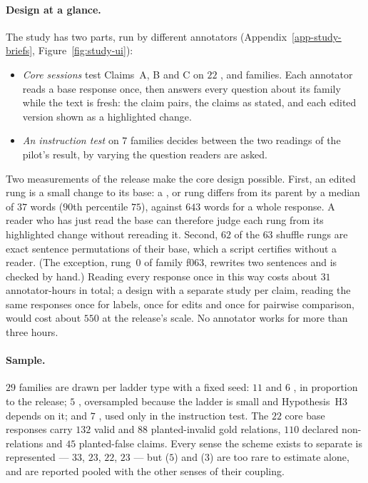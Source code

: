 \paragraph{Design at a glance.} The study has two parts, run by different annotators
(Appendix~\ref{app-study-briefs}, Figure~\ref{fig:study-ui}):
\begin{itemize}[leftmargin=1.4em,itemsep=1pt,topsep=2pt]
\item \emph{Core sessions} test Claims~A, B and C on $22$ ,  and 
  families. Each annotator reads a base response once, then answers every question about its family while the text
  is fresh: the claim pairs, the claims as stated, and each edited version shown as a highlighted change.
\item \emph{An instruction test} on $7$  families decides between the two readings of the pilot's
   result, by varying the question readers are asked.
\end{itemize}
Two measurements of the release make the core design possible. First, an edited rung is a small change to its
base: a ,  or  rung differs from its parent by a median of $37$
words ($90$th percentile $75$), against $643$ words for a whole response. A reader who has just read the base can
therefore judge each rung from its highlighted change without rereading it. Second, $62$ of the $63$
 shuffle rungs are exact sentence permutations of their base, which a script certifies without a
reader. (The exception, rung~$0$ of family f063, rewrites two sentences and is checked by hand.) Reading every
response once in this way costs about $31$ annotator-hours in total; a design with a separate study per claim,
reading the same responses once for labels, once for edits and once for pairwise comparison, would cost about
$550$ at the release's scale. No annotator works for more than three hours.

\paragraph{Sample.} $29$ families are drawn per ladder type with a fixed seed: $11$  and $6$
, in proportion to the release; $5$ , oversampled because the ladder is small and
Hypothesis~H3 depends on it; and $7$ , used only in the instruction test. The $22$ core base
responses carry $132$ valid and $88$ planted-invalid gold relations, $110$ declared non-relations and $45$
planted-false claims. Every sense the scheme exists to separate is represented ---  $33$,
 $23$,  $22$,  $23$ --- but  ($5$)
and  ($3$) are too rare to estimate alone, and are reported pooled with the other senses of their
coupling.

